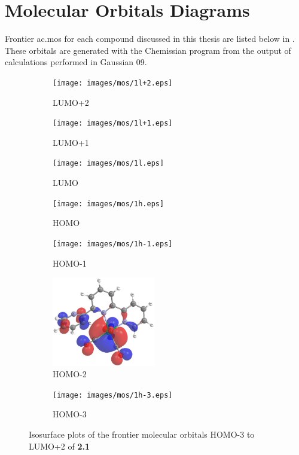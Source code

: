 \chapter{Molecular Orbitals Diagrams} \label{app.mos}

Frontier \glspl{ac.mo} for each compound discussed in this thesis are listed below in . These orbitals are generated with the Chemissian program\autocite{chemissian} from the output of calculations performed in Gaussian 09\autocite{gaussian}.

\begin{figure}[!ht]
 \centering
 \begin{subfigure}[b]{0.31\textwidth}
  \texttt{[image: images/mos/1l+2.eps]}
  \caption{LUMO+2}
 \end{subfigure}
  \begin{subfigure}[b]{0.31\textwidth}
  \texttt{[image: images/mos/1l+1.eps]}
  \caption{LUMO+1}
 \end{subfigure}
  \begin{subfigure}[b]{0.31\textwidth}
  \texttt{[image: images/mos/1l.eps]}
  \caption{LUMO}
 \end{subfigure}
 \begin{subfigure}[b]{0.31\textwidth}
  \texttt{[image: images/mos/1h.eps]}
  \caption{HOMO}
 \end{subfigure}
 \begin{subfigure}[b]{0.31\textwidth}
  \texttt{[image: images/mos/1h-1.eps]}
  \caption{HOMO-1}
 \end{subfigure}
 \begin{subfigure}[b]{0.31\textwidth}
  \includegraphics[clip=true, width=\textwidth, height=39mm, keepaspectratio]{images/mos/1h-2.eps}
  \caption{HOMO-2}
 \end{subfigure}
 \begin{subfigure}[b]{0.31\textwidth}
  \texttt{[image: images/mos/1h-3.eps]}
  \caption{HOMO-3}
 \end{subfigure}
\caption[Molecular orbitals HOMO-3 to LUMO+2 of \textbf{2.1}]{Isosurface plots of the frontier molecular orbitals HOMO-3 to LUMO+2 of \textbf{2.1}}
\label{fig.mo21}
\end{figure} 

